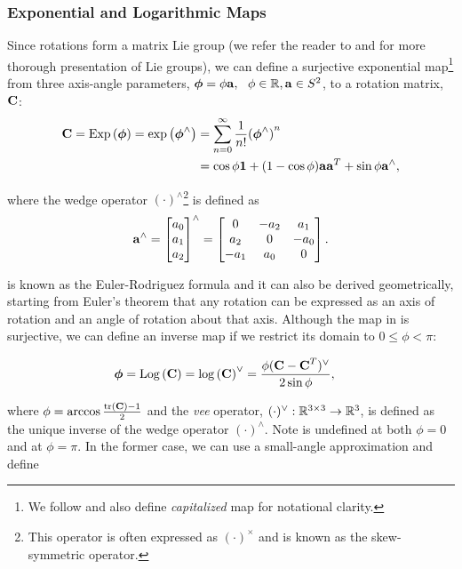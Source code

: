 \subsubsection{Exponential and Logarithmic Maps}

Since rotations form a matrix Lie group (we refer the reader to \cite{Sola2018-kg} and \cite{Barfoot2017-ri} for more thorough presentation of Lie groups), we can define a surjective exponential map\footnote{We follow \cite{Sola2018-kg} and also define \textit{capitalized} map for notational clarity.} from three axis-angle parameters, $\boldsymbol{\mathbf{\phi}} = \phi \boldsymbol{\mathbf{a}}, ~~ \phi \in \mathbb{R}{}, \boldsymbol{\mathbf{a}} \in S^2$, to a rotation matrix, $\boldsymbol{\mathbf{C}}$: 
\begin{align}
\label{eq:so3_exp}
\boldsymbol{\mathbf{C}} = \mathrm{Exp}\left({\boldsymbol{\mathbf{\phi}}}\right) = \mathrm{exp}\left({\boldsymbol{\mathbf{\phi}}}^{\wedge}\right) &= \sum_{n=0}^{\infty}  \frac{1}{n!} {(\boldsymbol{\mathbf{\phi}}^\wedge)}^n\\
\label{eq:euler_rodriguez}
&= \cos{\phi} \boldsymbol{\mathbf{1}} + (1 - \cos{\phi}) \boldsymbol{\mathbf{a}}\boldsymbol{\mathbf{a}}^T + \sin{\phi} \boldsymbol{\mathbf{a}}^\wedge,
\end{align}

where the wedge operator $(\cdot)^\wedge$\footnote{This operator is often expressed as $(\cdot)^\times$ and is known as the skew-symmetric operator.} is defined as
\begin{equation}
\boldsymbol{\mathbf{a}}^\wedge = \begin{bmatrix} a_0 \\ a_1 \\ a_2 \end{bmatrix}^\wedge = \begin{bmatrix} 0 & -a_2 & a_1 \\ a_2 & 0 & -a_0 \\ -a_1 & a_0 & 0 \end{bmatrix}.	
\end{equation}

 is known as the Euler-Rodriguez formula and it can also be derived geometrically, starting from Euler's theorem that any rotation can be expressed as an axis of rotation and an angle of rotation about that axis. Although  the map in  is surjective, we can define an inverse map if we restrict its domain to $0 \leq \phi < \pi$:

\begin{align}
\label{eq:so3_log}
\boldsymbol{\mathbf{\phi}} =  \mathrm{Log}\left({\boldsymbol{\mathbf{C}}}\right) = \mathrm{log}\left({\boldsymbol{\mathbf{C}}}\right)^{\vee} &= \frac{\phi (\boldsymbol{\mathbf{C}} - \boldsymbol{\mathbf{C}}^T)^\vee}{2 \sin{\phi}}, 
\end{align}

where $\phi = \arccos{\frac{ \mathrm{tr}\left(  \boldsymbol{\mathbf{C}}  \right)  - 1}{2}}$ and the \textit{vee} operator, $(\cdot)^\vee : \mathbb{R}{}^{3 \times 3} \rightarrow \mathbb{R}{}^3$, is defined as the unique inverse of the wedge operator $(\cdot)^\wedge$. Note  is undefined at both $\phi = 0$ and at $\phi = \pi$. In the former case, we can use a small-angle approximation and define

